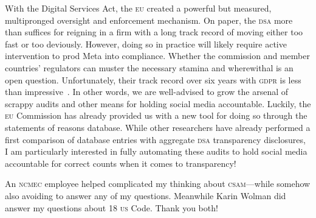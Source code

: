 \documentclass[nonacm,screen]{acmart}
\newcommand\V[1]{\textsc{\MakeLowercase{#1}}}
\begin{document}
With the Digital Services Act, the \V{EU} created a powerful but measured,
multipronged oversight and enforcement mechanism. On paper, the \V{DSA} more
than suffices for reigning in a firm with a long track record of moving either
too fast or too deviously. However, doing so in practice will likely require
active intervention to prod Meta into compliance. Whether the commission and
member countries' regulators can muster the necessary stamina and wherewithal is
an open question. Unfortunately, their track record over six years with \V{GDPR}
is less than impressive~\cite{Burgess2022}. In other words, we are well-advised
to grow the arsenal of scrappy audits and other means for holding social media
accountable. Luckily, the \V{EU} Commission has already provided us with a new
tool for doing so through the statements of reasons database. While other
researchers have already performed a first comparison of database entries with
aggregate \V{DSA} transparency disclosures, I am particularly interested in
fully automating these audits to hold social media accountable for correct
counts when it comes to transparency!



\begin{acks}
An \V{NCMEC} employee helped complicated my thinking about \V{CSAM}---while
somehow also avoiding to answer any of my questions. Meanwhile Karin Wolman did
answer my questions about 18 \V{US} Code. Thank you both!
\end{acks}



\end{document}
